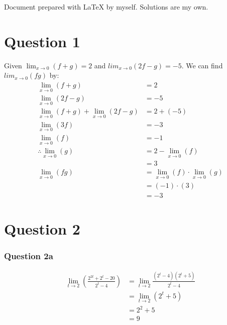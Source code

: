 \documentclass{article}
\begin{document}
\newcommand{\documentcourse}{MATH1853}
\newcommand{\documentnumber}{1}





Document prepared with LaTeX by myself. Solutions are my own.

\section*{Question 1}
Given $\lim_{x\to 0}(f+g)=2$ and $lim_{x\to 0}(2f-g)=-5$. We can find $lim_{x\to 0}(fg)$ by:
\begin{align*}
    \lim_{x\to 0}(f+g)                       & = 2                                       \\
    \lim_{x\to 0}(2f-g)                      & = -5                                      \\
    \lim_{x\to 0}(f+g) + \lim_{x\to 0}(2f-g) & = 2 + (-5)                                \\
    \lim_{x\to 0}(3f)                        & = -3                                      \\
    \lim_{x\to 0}(f)                         & = -1                                      \\
    \therefore \lim_{x\to 0}(g)              & = 2 - \lim_{x\to 0}(f)                    \\
                                             & = 3                                       \\
    \lim_{x\to 0}(fg)                        & = \lim_{x\to 0}(f) \cdot \lim_{x\to 0}(g) \\
                                             & = (-1) \cdot (3)                          \\
                                             & = -3
\end{align*}

\section*{Question 2}
\subsubsection*{Question 2a}
\begin{align*}
    \lim_{t\to 2}(\frac{2^{2t}+2^t-20}{2^t-4}) & = \lim_{t\to 2}\frac{(2^t-4)(2^t+5)}{2^t-4} \\
                                               & = \lim_{t\to 2}(2^t+5)                      \\
                                               & = 2^2+5                                     \\
                                               & = 9
\end{align*}
\end{document}
